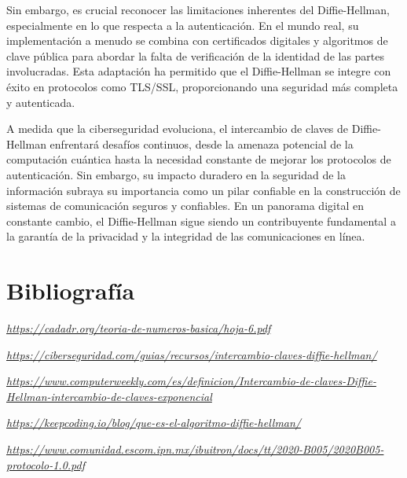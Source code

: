 \documentclass[11pt]{article}
\begin{document}
Sin embargo, es crucial reconocer las limitaciones inherentes del Diffie-Hellman, especialmente en lo que respecta a la autenticación. En el mundo real, su implementación a menudo se combina con certificados digitales y algoritmos de clave pública para abordar la falta de verificación de la identidad de las partes involucradas. Esta adaptación ha permitido que el Diffie-Hellman se integre con éxito en protocolos como TLS/SSL, proporcionando una seguridad más completa y autenticada.

A medida que la ciberseguridad evoluciona, el intercambio de claves de Diffie-Hellman enfrentará desafíos continuos, desde la amenaza potencial de la computación cuántica hasta la necesidad constante de mejorar los protocolos de autenticación. Sin embargo, su impacto duradero en la seguridad de la información subraya su importancia como un pilar confiable en la construcción de sistemas de comunicación seguros y confiables. En un panorama digital en constante cambio, el Diffie-Hellman sigue siendo un contribuyente fundamental a la garantía de la privacidad y la integridad de las comunicaciones en línea.

\newpage


\section{Bibliografía}

\textcolor{blue}{\emph{\href{https://cadadr.org/teoria-de-numeros-basica/hoja-6.pdf}{https://cadadr.org/teoria-de-numeros-basica/hoja-6.pdf}}}

\textcolor{blue}{\emph{\href{https://ciberseguridad.com/guias/recursos/intercambio-claves-diffie-hellman/}{https://ciberseguridad.com/guias/recursos/intercambio-claves-diffie-hellman/}}}

\textcolor{blue}{\emph{\href{https://www.computerweekly.com/es/definicion/Intercambio-de-claves-Diffie-Hellman-intercambio-de-claves-exponencial}{https://www.computerweekly.com/es/definicion/Intercambio-de-claves-Diffie-Hellman-intercambio-de-claves-exponencial}}}

\textcolor{blue}{\emph{\href{https://keepcoding.io/blog/que-es-el-algoritmo-diffie-hellman/}{https://keepcoding.io/blog/que-es-el-algoritmo-diffie-hellman/}}}

\textcolor{blue}{\emph{\href{https://www.comunidad.escom.ipn.mx/ibuitron/docs/tt/2020-B005/2020B005-protocolo-1.0.pdf}{https://www.comunidad.escom.ipn.mx/ibuitron/docs/tt/2020-B005/2020B005-protocolo-1.0.pdf}}}
\end{document}
